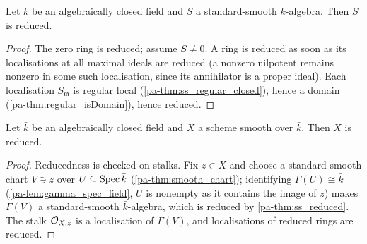 \begin{theorem}
  \label{pa-thm:ss_reduced}
  \leanok

  Let \(\bar k\) be an algebraically closed field and \(S\) a standard-smooth
  \(\bar k\)-algebra. Then \(S\) is reduced.
\end{theorem}
\begin{proof}
  \leanok
  The zero ring is reduced; assume \(S \neq 0\). A ring is reduced as soon as
  its localisations at all maximal ideals are reduced (a nonzero nilpotent
  remains nonzero in some such localisation, since its annihilator is a proper
  ideal). Each localisation \(S_{\mathfrak m}\) is regular local
  (\ref{pa-thm:ss_regular_closed}), hence a domain
  (\ref{pa-thm:regular_isDomain}), hence reduced.
\end{proof}

\begin{theorem}
  \label{pa-thm:smooth_scheme_reduced}
  \leanok

  Let \(\bar k\) be an algebraically closed field and \(X\) a scheme smooth
  over \(\bar k\). Then \(X\) is reduced.
\end{theorem}
\begin{proof}
  \leanok
  Reducedness is checked on stalks. Fix \(z \in X\) and choose a
  standard-smooth chart \(V \ni z\) over \(U \subseteq \operatorname{Spec} \bar k\)
  (\ref{pa-thm:smooth_chart}); identifying \(\Gamma(U) \cong \bar k\)
  (\ref{pa-lem:gamma_spec_field}, \(U\) is nonempty as it contains the image of
  \(z\)) makes \(\Gamma(V)\) a standard-smooth \(\bar k\)-algebra, which is
  reduced by \ref{pa-thm:ss_reduced}. The stalk \(\mathcal{O}_{X,z}\) is a localisation
  of \(\Gamma(V)\), and localisations of reduced rings are reduced.
\end{proof}


